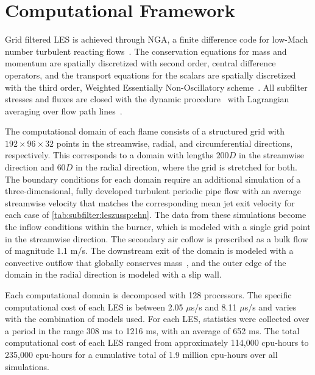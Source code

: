 \section{Computational Framework}
\label{sec:lesresults:comput}

Grid filtered LES is achieved through NGA, a finite difference code for low-Mach number turbulent reacting flows~\cite{desjardins2008}. The conservation equations for mass and momentum are spatially discretized with second order, central difference operators, and the transport equations for the scalars are spatially discretized with the third order, Weighted Essentially Non-Oscillatory scheme~\cite{jiang1996}. All subfilter stresses and fluxes are closed with the dynamic procedure~\cite{germano1991,lilly1992,moin1991} with Lagrangian averaging over flow path lines~\cite{meneveau1996,reveillon1996}.

The computational domain of each flame consists of a structured grid with $192 \times 96 \times 32$ points in the streamwise, radial, and circumferential directions, respectively. This corresponds to a domain with lengths $200D$ in the streamwise direction and $60D$ in the radial direction, where the grid is stretched for both. The boundary conditions for each domain require an additional simulation of a three-dimensional, fully developed turbulent periodic pipe flow with an average streamwise velocity that matches the corresponding mean jet exit velocity for each case of \cref{tab:subfilter:leszussp:ehn}. The data from these simulations become the inflow conditions within the burner, which is modeled with a single grid point in the streamwise direction. The secondary air coflow is prescribed as a bulk flow of magnitude 1.1 m/s. The downstream exit of the domain is modeled with a convective outflow that globally conserves mass~\cite{akselvoll1996}, and the outer edge of the domain in the radial direction is modeled with a slip wall.

Each computational domain is decomposed with 128 processors. The specific computational cost of each LES is between 2.05 $\mu$s/s and 8.11 $\mu$s/s and varies with the combination of models used. For each LES, statistics were collected over a period in the range 308 ms to 1216 ms, with an average of 652 ms. The total computational cost of each LES ranged from approximately 114,000 cpu-hours to 235,000 cpu-hours for a cumulative total of 1.9 million cpu-hours over all simulations. %

